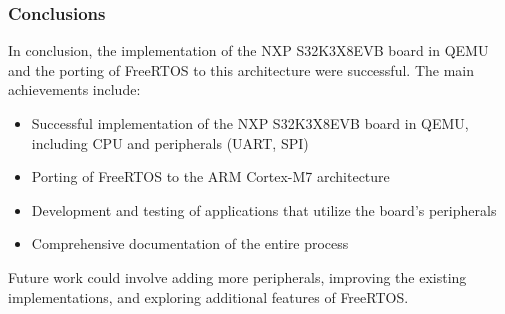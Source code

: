 \documentclass{beamer}
\begin{document}
\begin{frame}
\frametitle{Conclusions}
    In conclusion, the implementation of the NXP S32K3X8EVB board in QEMU and the porting of FreeRTOS to this architecture were successful. The main achievements include:
    \begin{itemize}
        \item Successful implementation of the NXP S32K3X8EVB board in QEMU, including CPU and peripherals (UART, SPI)
        \item Porting of FreeRTOS to the ARM Cortex-M7 architecture
        \item Development and testing of applications that utilize the board's peripherals
        \item Comprehensive documentation of the entire process
    \end{itemize}
    
    Future work could involve adding more peripherals, improving the existing implementations, and exploring additional features of FreeRTOS.
\end{frame}

\backmatter
\end{document}

